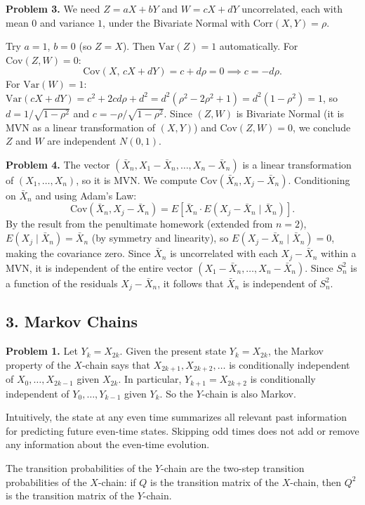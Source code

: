 \documentclass{article}
\begin{document}
\bigskip
\textbf{Problem 3.} We need $Z=aX+bY$ and $W=cX+dY$ uncorrelated, each with mean $0$ and variance $1$, under the Bivariate Normal with $\text{Corr}(X,Y)=\rho$.

Try $a=1$, $b=0$ (so $Z=X$). Then $\text{Var}(Z)=1$ automatically. For $\text{Cov}(Z,W)=0$:
$$
\text{Cov}(X,\,cX+dY)=c+d\rho=0 \implies c=-d\rho.
$$
For $\text{Var}(W)=1$: $\text{Var}(cX+dY)=c^2+2cd\rho+d^2=d^2(\rho^2-2\rho^2+1)=d^2(1-\rho^2)=1$, so $d=1/\sqrt{1-\rho^2}$ and $c=-\rho/\sqrt{1-\rho^2}$. Since $(Z,W)$ is Bivariate Normal (it is MVN as a linear transformation of $(X,Y)$) and $\text{Cov}(Z,W)=0$, we conclude $Z$ and $W$ are independent $N(0,1)$.

\bigskip
\textbf{Problem 4.} The vector $(\bar X_n,X_1-\bar X_n,\dots,X_n-\bar X_n)$ is a linear transformation of $(X_1,\dots,X_n)$, so it is MVN. We compute $\text{Cov}(\bar X_n,X_j-\bar X_n)$. Conditioning on $\bar X_n$ and using Adam's Law:
$$
\text{Cov}(\bar X_n,X_j-\bar X_n)=E\!\left[\bar X_n\cdot E(X_j-\bar X_n\mid\bar X_n)\right].
$$
By the result from the penultimate homework (extended from $n=2$), $E(X_j\mid\bar X_n)=\bar X_n$ (by symmetry and linearity), so $E(X_j-\bar X_n\mid\bar X_n)=0$, making the covariance zero. Since $\bar X_n$ is uncorrelated with each $X_j-\bar X_n$ within a MVN, it is independent of the entire vector $(X_1-\bar X_n,\dots,X_n-\bar X_n)$. Since $S_n^2$ is a function of the residuals $X_j-\bar X_n$, it follows that $\bar X_n$ is independent of $S_n^2$.

\subsection*{3. Markov Chains}

\textbf{Problem 1.} Let $Y_k=X_{2k}$. Given the present state $Y_k=X_{2k}$, the Markov property of the $X$-chain says that $X_{2k+1},X_{2k+2},\dots$ is conditionally independent of $X_0,\dots,X_{2k-1}$ given $X_{2k}$. In particular, $Y_{k+1}=X_{2k+2}$ is conditionally independent of $Y_0,\dots,Y_{k-1}$ given $Y_k$. So the $Y$-chain is also Markov.

Intuitively, the state at any even time summarizes all relevant past information for predicting future even-time states. Skipping odd times does not add or remove any information about the even-time evolution.

The transition probabilities of the $Y$-chain are the two-step transition probabilities of the $X$-chain: if $Q$ is the transition matrix of the $X$-chain, then $Q^2$ is the transition matrix of the $Y$-chain.
\end{document}
